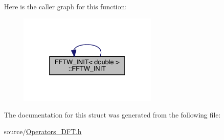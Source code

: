 Here is the caller graph for this function\+:\nopagebreak
\begin{figure}[H]
\begin{center}
\leavevmode
\includegraphics[width=195pt]{d6/dc2/struct_f_f_t_w___i_n_i_t_3_01double_01_4_ac70ec8b65ae3324527d4ee308ee7a7bd_icgraph}
\end{center}
\end{figure}




The documentation for this struct was generated from the following file\+:\begin{DoxyCompactItemize}
\item 
source/\hyperlink{_operators___d_f_t_8h}{Operators\+\_\+\+D\+F\+T.\+h}\end{DoxyCompactItemize}
